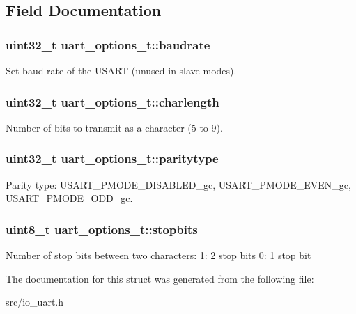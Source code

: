 \subsection{Field Documentation}
\hypertarget{structuart__options__t_af1331e929d8651ee0add871f01dfa757}{
\subsubsection[{baudrate}]{\setlength{\rightskip}{0pt plus 5cm}uint32\+\_\+t uart\+\_\+options\+\_\+t\+::baudrate}}\label{structuart__options__t_af1331e929d8651ee0add871f01dfa757}
Set baud rate of the U\+S\+A\+R\+T (unused in slave modes). \hypertarget{structuart__options__t_addd38e87d5dbf092c320c027ec94816f}{
\subsubsection[{charlength}]{\setlength{\rightskip}{0pt plus 5cm}uint32\+\_\+t uart\+\_\+options\+\_\+t\+::charlength}}\label{structuart__options__t_addd38e87d5dbf092c320c027ec94816f}
Number of bits to transmit as a character (5 to 9). \hypertarget{structuart__options__t_ad3fade57f7af5f4aae676ac213da8137}{
\subsubsection[{paritytype}]{\setlength{\rightskip}{0pt plus 5cm}uint32\+\_\+t uart\+\_\+options\+\_\+t\+::paritytype}}\label{structuart__options__t_ad3fade57f7af5f4aae676ac213da8137}
Parity type\+: U\+S\+A\+R\+T\+\_\+\+P\+M\+O\+D\+E\+\_\+\+D\+I\+S\+A\+B\+L\+E\+D\+\_\+gc, U\+S\+A\+R\+T\+\_\+\+P\+M\+O\+D\+E\+\_\+\+E\+V\+E\+N\+\_\+gc, U\+S\+A\+R\+T\+\_\+\+P\+M\+O\+D\+E\+\_\+\+O\+D\+D\+\_\+gc. \hypertarget{structuart__options__t_a550828453e5dd05b8fbdd0c4cfc1b0e4}{
\subsubsection[{stopbits}]{\setlength{\rightskip}{0pt plus 5cm}uint8\+\_\+t uart\+\_\+options\+\_\+t\+::stopbits}}\label{structuart__options__t_a550828453e5dd05b8fbdd0c4cfc1b0e4}
Number of stop bits between two characters\+: 1\+: 2 stop bits 0\+: 1 stop bit 

The documentation for this struct was generated from the following file\+:\begin{DoxyCompactItemize}
\item 
src/io\+\_\+uart.\+h\end{DoxyCompactItemize}
